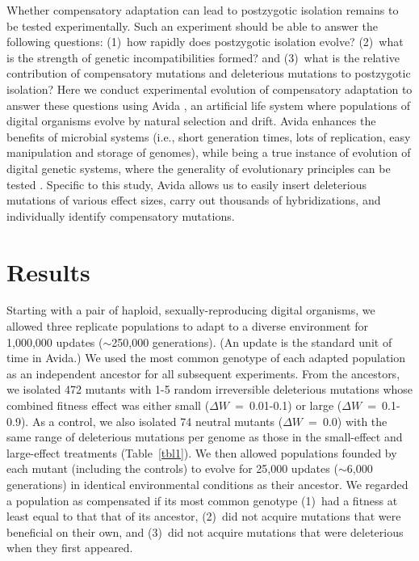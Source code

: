 \documentclass{article}
\begin{document}
Whether compensatory adaptation can lead to postzygotic isolation
remains to be tested experimentally.
%
Such an experiment should be able to answer the following questions:
(1)~how rapidly does postzygotic isolation evolve?
(2)~what is the strength of genetic incompatibilities formed?
and (3)~what is the relative contribution of compensatory mutations
and deleterious mutations to postzygotic isolation?
%
Here we conduct experimental evolution
of compensatory adaptation to answer these questions
using Avida \cite{ofr04}, an artificial life system
where populations of digital organisms
evolve by natural selection and drift.
%
Avida enhances the benefits of microbial systems
(i.e., short generation times, lots of replication,
easy manipulation and storage of genomes),
while being a true instance of evolution of digital genetic systems,
where the generality of evolutionary principles can be tested
\cite{len99,ele08,mis06}.
%
Specific to this study, Avida allows us to easily insert deleterious mutations
of various effect sizes, carry out thousands of hybridizations,
and individually identify compensatory mutations.



\section*{Results}

Starting with a pair of haploid, sexually-reproducing digital organisms,
we allowed three replicate populations to adapt to a diverse environment
for 1,000,000 updates ($\sim$250,000 generations).
%
(An update is the standard unit of time in Avida.)
%
We used the most common genotype of each adapted population
as an independent ancestor for all subsequent experiments.
%
From the ancestors, we isolated 472 mutants
with 1-5 random irreversible deleterious mutations
whose combined fitness effect was either
small ($\Delta W$~=~0.01-0.1) or large ($\Delta W$~=~0.1-0.9).
%
As a control, we also isolated 74 neutral mutants ($\Delta W$~=~0.0)
with the same range of deleterious mutations per genome as those
in the small-effect and large-effect treatments (Table~\ref{tbl1}).
%
We then allowed populations founded by each mutant (including the controls)
to evolve for 25,000 updates ($\sim$6,000 generations)
in identical environmental conditions as their ancestor.
%
We regarded a population as compensated if its most common genotype
(1)~had a fitness at least equal to that that of its ancestor,
(2)~did not acquire mutations that were beneficial on their own, and
(3)~did not acquire mutations that were deleterious when they first appeared.
\end{document}
